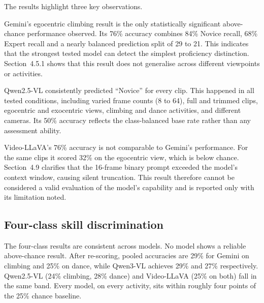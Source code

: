 \documentclass[logo,msc]{infthesis}
\begin{document}
The results highlight three key observations.

Gemini's egocentric climbing result is the only statistically significant
above-chance performance observed. Its 76\% accuracy combines 84\% Novice
recall, 68\% Expert recall and a nearly balanced prediction split of 29 to
21. This indicates that the strongest tested model can detect the simplest
proficiency distinction. Section~4.5.1 shows that this result does not
generalise across different viewpoints or activities.

Qwen2.5-VL consistently predicted ``Novice'' for every clip. This happened
in all tested conditions, including varied frame counts (8 to 64), full and
trimmed clips, egocentric and exocentric views, climbing and dance
activities, and different cameras. Its 50\% accuracy reflects the
class-balanced base rate rather than any assessment ability.

Video-LLaVA's 76\% accuracy is not comparable to Gemini's performance. For
the same clips it scored 32\% on the egocentric view, which is below
chance. Section~4.9 clarifies that the 16-frame binary prompt exceeded the
model's context window, causing silent truncation. This result therefore
cannot be considered a valid evaluation of the model's capability and is
reported only with its limitation noted.

\subsection{Four-class skill discrimination}

The four-class results are consistent across models. No model shows a
reliable above-chance result. After re-scoring, pooled accuracies are 29\%
for Gemini on climbing and 25\% on dance, while Qwen3-VL achieves 29\% and
27\% respectively. Qwen2.5-VL (24\% climbing, 28\% dance) and Video-LLaVA
(25\% on both) fall in the same band. Every model, on every activity, sits
within roughly four points of the 25\% chance baseline.
\end{document}
